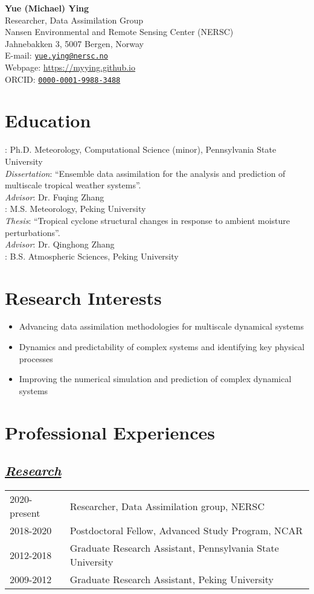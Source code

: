 \documentclass{article}
\newcommand{\cvsection}[1]{\section*{\bfseries#1}}
\newcommand{\cvsubsection}[1]{\subsection*{\itshape\uline{#1}}}
\begin{document}
\begin{center}
\huge{\textbf{Yue (Michael) Ying}} \\
\vspace{10pt}
\normalsize{Researcher, Data Assimilation Group \\
Nansen Environmental and Remote Sensing Center (NERSC) \\
Jahnebakken 3, 5007 Bergen, Norway \\
E-mail: \href{mailto:yue.ying@nersc.no}{\texttt{yue.ying@nersc.no}} \\
Webpage: \url{https://myying.github.io} \\
ORCID: \href{https://orcid.org/0000-0001-9988-3488}{\texttt{0000-0001-9988-3488}} }
\end{center}

\cvsection{Education}
: Ph.D. Meteorology, Computational Science (minor), Pennsylvania State University \\
\indent \textit{Dissertation}: ``Ensemble data assimilation for the analysis and prediction of multiscale tropical weather systems''. \\
\indent \textit{Advisor}: Dr. Fuqing Zhang \\

: M.S. Meteorology, Peking University \\
\indent \textit{Thesis}: ``Tropical cyclone structural changes in response to ambient moisture perturbations''. \\
\indent \textit{Advisor}: Dr. Qinghong Zhang \\

: B.S. Atmospheric Sciences, Peking University

\cvsection{Research Interests}
\begin{itemize}[leftmargin=2em, topsep=0pt, itemsep=0pt]
    \item Advancing data assimilation methodologies for multiscale dynamical systems
    \item Dynamics and predictability of complex systems and identifying key physical processes
    \item Improving the numerical simulation and prediction of complex dynamical systems
\end{itemize}


\cvsection{Professional Experiences}
\cvsubsection{Research}
\begin{tabular}{l l}
    2020-present & Researcher, Data Assimilation group, NERSC \\
    2018-2020 & Postdoctoral Fellow, Advanced Study Program, NCAR \\
    2012-2018 & Graduate Research Assistant, Pennsylvania State University \\
    2009-2012 & Graduate Research Assistant, Peking University \\
\end{tabular}
\end{document}
